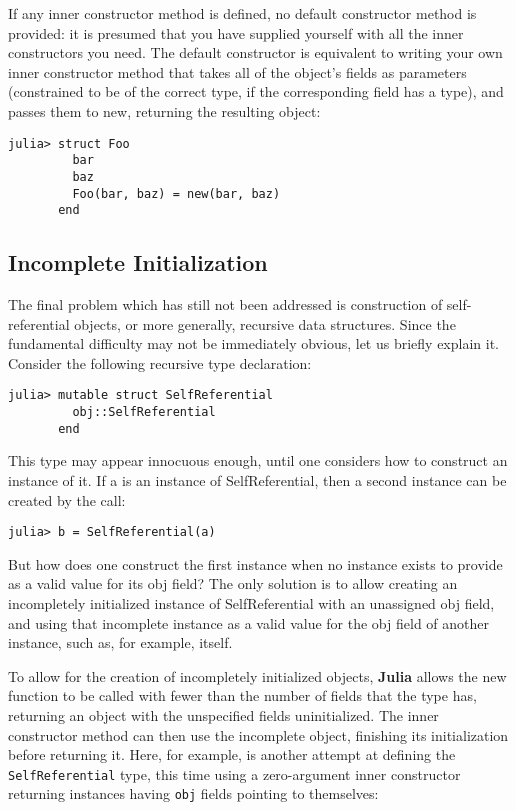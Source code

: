 \documentclass[
]{article}
\begin{document}
If any inner constructor method is defined, no default constructor
method is provided: it is presumed that you have supplied yourself with
all the inner constructors you need. The default constructor is
equivalent to writing your own inner constructor method that takes all
of the object's fields as parameters (constrained to be of the correct
type, if the corresponding field has a type), and passes them to new,
returning the resulting object:

\begin{verbatim}
julia> struct Foo
         bar
         baz
         Foo(bar, baz) = new(bar, baz)
       end
\end{verbatim}

\hypertarget{incomplete-initialization}{%
\subsection{Incomplete Initialization}\label{incomplete-initialization}}

The final problem which has still not been addressed is construction of
self-referential objects, or more generally, recursive data structures.
Since the fundamental difficulty may not be immediately obvious, let us
briefly explain it. Consider the following recursive type declaration:

\begin{verbatim}
julia> mutable struct SelfReferential
         obj::SelfReferential
       end
\end{verbatim}

This type may appear innocuous enough, until one considers how to
construct an instance of it. If a is an instance of SelfReferential,
then a second instance can be created by the call:

\begin{verbatim}
julia> b = SelfReferential(a)
\end{verbatim}

But how does one construct the first instance when no instance exists to
provide as a valid value for its obj field? The only solution is to
allow creating an incompletely initialized instance of SelfReferential
with an unassigned obj field, and using that incomplete instance as a
valid value for the obj field of another instance, such as, for example,
itself.

To allow for the creation of incompletely initialized objects,
\textbf{Julia} allows the new function to be called with fewer than the
number of fields that the type has, returning an object with the
unspecified fields uninitialized. The inner constructor method can then
use the incomplete object, finishing its initialization before returning
it. Here, for example, is another attempt at defining the
\texttt{SelfReferential} type, this time using a zero-argument inner
constructor returning instances having \texttt{obj} fields pointing to
themselves:
\end{document}
